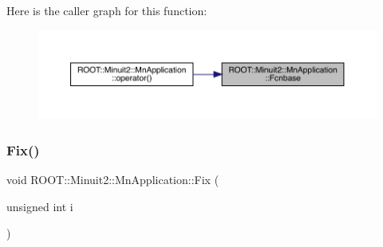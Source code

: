 Here is the caller graph for this function\+:\nopagebreak
\begin{figure}[H]
\begin{center}
\leavevmode
\includegraphics[width=350pt]{df/dd5/classROOT_1_1Minuit2_1_1MnApplication_af4eb3fe4927d3a8e0efcd5c6b7100881_icgraph}
\end{center}
\end{figure}
\mbox{\label{classROOT_1_1Minuit2_1_1MnApplication_a98bea1ca3fb2a311b1c0e72a58ec2d9f}} 
\subsubsection{\texorpdfstring{Fix()}{Fix()}\hspace{0.1cm}{\footnotesize\ttfamily [1/4]}}
{\footnotesize\ttfamily void R\+O\+O\+T\+::\+Minuit2\+::\+Mn\+Application\+::\+Fix (\begin{DoxyParamCaption}\item[{unsigned int}]{i }\end{DoxyParamCaption})}

